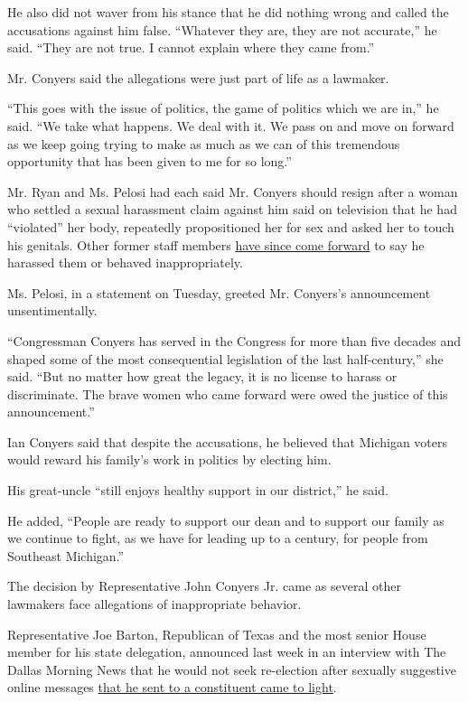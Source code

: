 He also did not waver from his stance that he did nothing wrong and
called the accusations against him false. ``Whatever they are, they are
not accurate,'' he said. ``They are not true. I cannot explain where
they came from.''

Mr. Conyers said the allegations were just part of life as a lawmaker.

``This goes with the issue of politics, the game of politics which we
are in,'' he said. ``We take what happens. We deal with it. We pass on
and move on forward as we keep going trying to make as much as we can of
this tremendous opportunity that has been given to me for so long.''

Mr. Ryan and Ms. Pelosi had each said Mr. Conyers should resign after a
woman who settled a sexual harassment claim against him said on
television that he had ``violated'' her body, repeatedly propositioned
her for sex and asked her to touch his genitals. Other former staff
members
\href{https://www.nytimes.com/2017/11/28/us/politics/conyers-sexual-harassment-democrats-pelosi.html}{have
since come forward} to say he harassed them or behaved inappropriately.

Ms. Pelosi, in a statement on Tuesday, greeted Mr. Conyers's
announcement unsentimentally.

``Congressman Conyers has served in the Congress for more than five
decades and shaped some of the most consequential legislation of the
last half-century,'' she said. ``But no matter how great the legacy, it
is no license to harass or discriminate. The brave women who came
forward were owed the justice of this announcement.''

Ian Conyers said that despite the accusations, he believed that Michigan
voters would reward his family's work in politics by electing him.

His great-uncle ``still enjoys healthy support in our district,'' he
said.

He added, ``People are ready to support our dean and to support our
family as we continue to fight, as we have for leading up to a century,
for people from Southeast Michigan.''

The decision by Representative John Conyers Jr. came as several other
lawmakers face allegations of inappropriate behavior.

Representative Joe Barton, Republican of Texas and the most senior House
member for his state delegation, announced last week in an interview
with The Dallas Morning News that he would not seek re-election after
sexually suggestive online messages
\href{https://www.nytimes.com/2017/11/22/us/politics/joe-barton-explicit-photo-twitter.html}{that
he sent to a constituent came to light}.

